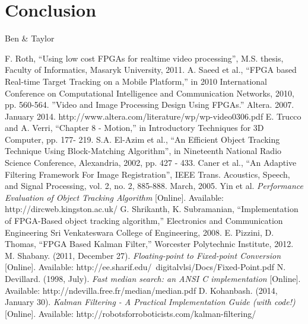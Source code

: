 \documentclass[12pt]{article} %
\begin{document}
\section{Conclusion}
Ben \& Taylor
\newpage
\begin{thebibliography}{11}
F. Roth, “Using low cost FPGAs for realtime video processing”, M.S. thesis, Faculty of Informatics, Masaryk University, 2011.
A. Saeed et al., “FPGA based Real-time Target Tracking on a Mobile Platform,” in 2010 International Conference on Computational Intelligence and Communication Networks, 2010, pp. 560-564.
”Video and Image Processing Design Using FPGAs.” Altera. 2007. January 2014. 
http://www.altera.com/literature/wp/wp-video0306.pdf  
E. Trucco and A. Verri, “Chapter 8 - Motion,” in Introductory Techniques for 3D Computer, pp. 177- 219.
S.A. El-Azim et al., “An Efficient Object Tracking Technique Using Block-Matching Algorithm”, in Nineteenth National Radio Science Conference, Alexandria, 2002, pp. 427 - 433.
Caner et al., “An Adaptive Filtering Framework For Image Registration”, IEEE Trans. Acoustics, Speech, and Signal Processing, vol. 2, no. 2, 885-888. March, 2005. 
Yin et al. \textit{Performance Evaluation of Object Tracking Algorithm} [Online]. Available: http://dircweb.kingston.ac.uk/ 
G. Shrikanth, K. Subramanian, “Implementation of FPGA-Based object tracking algorithm,” Electronics and Communication Engineering Sri Venkateswara College of Engineering, 2008.
E. Pizzini, D. Thomas, “FPGA Based Kalman Filter,” Worcester Polytechnic Institute, 2012.
M. Shabany. (2011, December 27). \textit{Floating-point to Fixed-point Conversion} [Online]. Available: http://ee.sharif.edu/~digitalvlsi/Docs/Fixed-Point.pdf
N. Devillard. (1998, July). \textit{Fast median search: an ANSI C implementation} [Online]. Available: http://ndevilla.free.fr/median/median.pdf
D. Kohanbash. (2014, January 30). \textit{Kalman Filtering - A Practical Implementation Guide (with code!)} [Online]. Available: http://robotsforroboticists.com/kalman-filtering/
\end{thebibliography}
\newpage
\appendix
\appendixpage
\end{document}
